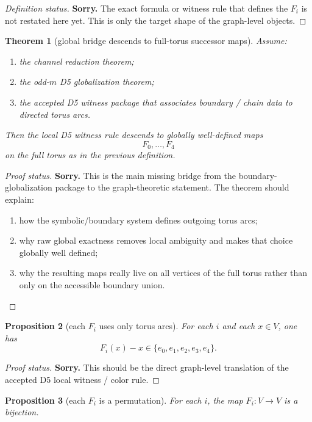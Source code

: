 \documentclass[11pt]{article}
\newtheorem{theorem}{Theorem}[section]
\newtheorem{proposition}[theorem]{Proposition}
\begin{document}
\begin{proof}[Definition status]
\textbf{Sorry.} The exact formula or witness rule that defines the $F_i$ is not
restated here yet. This is only the target shape of the graph-level objects.
\end{proof}

\begin{theorem}[global bridge descends to full-torus successor maps]
Assume:
\begin{enumerate}[label=\textup{(\arabic*)},leftmargin=2.5em]
\item the channel reduction theorem;
\item the odd-$m$ D5 globalization theorem;
\item the accepted D5 witness package that associates boundary / chain data to
      directed torus arcs.
\end{enumerate}
Then the local D5 witness rule descends to globally well-defined maps
\[
F_0,\dots,F_4
\]
on the full torus as in the previous definition.
\end{theorem}

\begin{proof}[Proof status]
\textbf{Sorry.} This is the main missing bridge from the boundary-globalization
package to the graph-theoretic statement. The theorem should explain:
\begin{enumerate}[label=\textup{(\arabic*)},leftmargin=2.5em]
\item how the symbolic/boundary system defines outgoing torus arcs;
\item why raw global exactness removes local ambiguity and makes that choice
      globally well defined;
\item why the resulting maps really live on all vertices of the full torus
      rather than only on the accessible boundary union.
\end{enumerate}
\end{proof}

\begin{proposition}[each $F_i$ uses only torus arcs]
For each $i$ and each $x\in V$, one has
\[
F_i(x)-x \in \{e_0,e_1,e_2,e_3,e_4\}.
\]
\end{proposition}

\begin{proof}[Proof status]
\textbf{Sorry.} This should be the direct graph-level translation of the
accepted D5 local witness / color rule.
\end{proof}

\begin{proposition}[each $F_i$ is a permutation]
For each $i$, the map $F_i:V\to V$ is a bijection.
\end{proposition}
\end{document}
